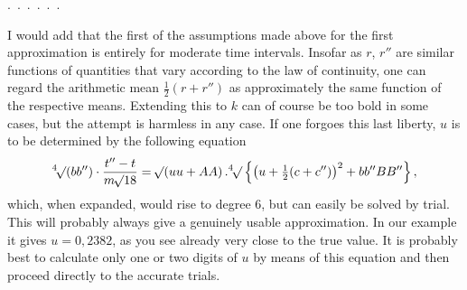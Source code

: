 \noindent\hspace*{\parindent}.\ .\ .\ .\ .\ .\par
I would add that the first of the assumptions made above for the first approximation is entirely  for moderate time intervals. Insofar as \(r\), \(r''\) are similar functions of quantities that vary according to the law of continuity, one can regard the arithmetic mean \(\tfrac12(r+r'')\) as approximately the same function of the respective means. Extending this to \(k\) can of course be too bold in some cases, but the attempt is harmless in any case. If one forgoes this last liberty, \(u\) is to be determined by the following equation
\[
\BareRoot[4]{(bb'')}\cdot\frac{t''-t}{m\BareRoot{18}}=\BareRoot{(uu+AA)}\,.\BareRoot[4]{\left\{\bigl(u+\tfrac12(c+c'')\bigr)^2+bb''BB''\right\}},
\]
which, when expanded, would rise to degree 6, but can easily be solved by trial. This will probably always give a genuinely usable approximation. In our example it gives \(u=0{,}2382\), as you see already very close to the true value. It is probably best to calculate only one or two digits of \(u\) by means of this equation and then proceed directly to the accurate trials.
\par\medskip\noindent\makebox[\linewidth]{\rule{.18\linewidth}{.35pt}}\par
